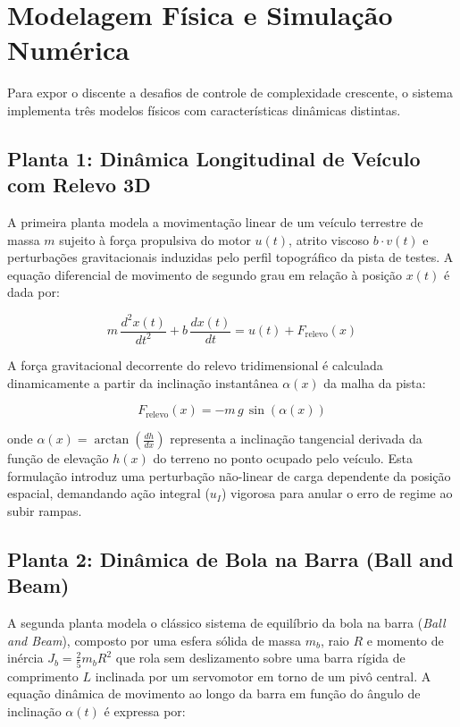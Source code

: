 \section{Modelagem Física e Simulação Numérica}
\label{sec:modelagem_fisica}

Para expor o discente a desafios de controle de complexidade crescente, o sistema implementa três modelos físicos com características dinâmicas distintas.

\subsection{Planta 1: Dinâmica Longitudinal de Veículo com Relevo 3D}
\label{subsec:planta_carro}

A primeira planta modela a movimentação linear de um veículo terrestre de massa $m$ sujeito à força propulsiva do motor $u(t)$, atrito viscoso $b \cdot v(t)$ e perturbações gravitacionais induzidas pelo perfil topográfico da pista de testes. A equação diferencial de movimento de segundo grau em relação à posição $x(t)$ é dada por:

\begin{equation}
    m \, \frac{d^2 x(t)}{dt^2} + b \, \frac{dx(t)}{dt} = u(t) + F_{\text{relevo}}(x)
    \label{eq:dinamica_veiculo}
\end{equation}

A força gravitacional decorrente do relevo tridimensional é calculada dinamicamente a partir da inclinação instantânea $\alpha(x)$ da malha da pista:

\begin{equation}
    F_{\text{relevo}}(x) = - m \, g \, \sin(\alpha(x))
    \label{eq:forca_relevo}
\end{equation}

\noindent onde $\alpha(x) = \arctan\left(\frac{dh}{dx}\right)$ representa a inclinação tangencial derivada da função de elevação $h(x)$ do terreno no ponto ocupado pelo veículo. Esta formulação introduz uma perturbação não-linear de carga dependente da posição espacial, demandando ação integral ($u_I$) vigorosa para anular o erro de regime ao subir rampas.

\subsection{Planta 2: Dinâmica de Bola na Barra (Ball and Beam)}
\label{subsec:planta_ball_beam}

A segunda planta modela o clássico sistema de equilíbrio da bola na barra (\textit{Ball and Beam}), composto por uma esfera sólida de massa $m_b$, raio $R$ e momento de inércia $J_b = \frac{2}{5} m_b R^2$ que rola sem deslizamento sobre uma barra rígida de comprimento $L$ inclinada por um servomotor em torno de um pivô central. A equação dinâmica de movimento ao longo da barra em função do ângulo de inclinação $\alpha(t)$ é expressa por:

